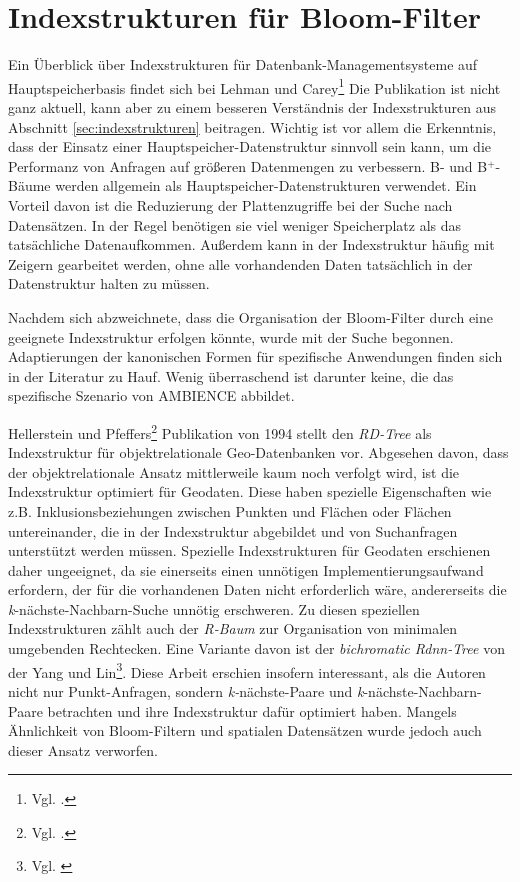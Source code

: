 \section{Indexstrukturen für Bloom-Filter}\label{sec:bloom-index}
Ein Überblick über Indexstrukturen für Datenbank-Managementsysteme auf Hauptspei\-cher\-basis findet sich bei Lehman und Carey\footnote{Vgl. \cite{Lehman1986}.} Die Publikation ist nicht ganz aktuell, kann aber zu einem besseren Verständnis der Indexstrukturen aus Abschnitt \ref{sec:indexstrukturen} beitragen. Wichtig ist vor allem die Erkenntnis, dass der Einsatz einer Hauptspeicher-Datenstruktur sinnvoll sein kann, um die Performanz von Anfragen auf größeren Datenmengen zu verbessern. B- und B$^+$-Bäume werden allgemein als Hauptspeicher-Datenstruk\-turen verwendet. Ein Vorteil davon ist die Reduzierung der Plattenzugriffe bei der Suche nach Datensätzen. In der Regel benötigen sie viel weniger Speicherplatz als das tatsächliche Datenaufkommen. Außerdem kann in der Indexstruktur häufig mit Zeigern gearbeitet werden, ohne alle vorhandenden Daten tatsächlich in der Datenstruktur halten zu müssen. 

Nachdem sich abzweichnete, dass die Organisation der Bloom-Filter durch eine geeignete Indexstruktur erfolgen könnte, wurde mit der Suche begonnen. Adaptierungen der kanonischen Formen für spezifische Anwendungen finden sich in der Literatur zu Hauf. Wenig überraschend ist darunter keine, die das spezifische Szenario von AMBIENCE abbildet.

Hellerstein und Pfeffers\footnote{Vgl. \cite{Hellerstein1994}.} Publikation von 1994 stellt den \textit{RD-Tree} als Indexstruktur für objektrelationale Geo-Datenbanken vor. Abgesehen davon, dass der objektrelationale Ansatz mittlerweile kaum noch verfolgt wird, ist die Indexstruktur optimiert für Geodaten. Diese haben spezielle Eigenschaften wie z.B. Inklusionsbeziehungen zwischen Punkten und Flächen oder Flächen untereinander, die in der Indexstruktur abgebildet und von Suchanfragen unterstützt werden müssen. Spezielle Indexstrukturen für Geodaten erschienen daher ungeeignet, da sie einerseits einen unnötigen Implementierungsaufwand erfordern, der für die vorhandenen Daten nicht erforderlich wäre, andererseits die \textit{k}-nächste-Nachbarn-Suche unnötig erschweren. Zu diesen speziellen Indexstrukturen zählt auch der \textit{R-Baum} zur Organisation von minimalen umgebenden Rechtecken. Eine Variante davon ist der \textit{bichromatic Rdnn-Tree} von der Yang und Lin\footnote{Vgl. \cite{Yang2002}}. Diese Arbeit erschien insofern interessant, als die Autoren nicht nur Punkt-Anfragen, sondern \textit{k-}nächste-Paare und \textit{k}-nächste-Nachbarn-Paare betrachten und ihre Indexstruktur dafür optimiert haben. Mangels Ähnlichkeit von Bloom-Filtern und spatialen Datensätzen wurde jedoch auch dieser Ansatz verworfen. 

